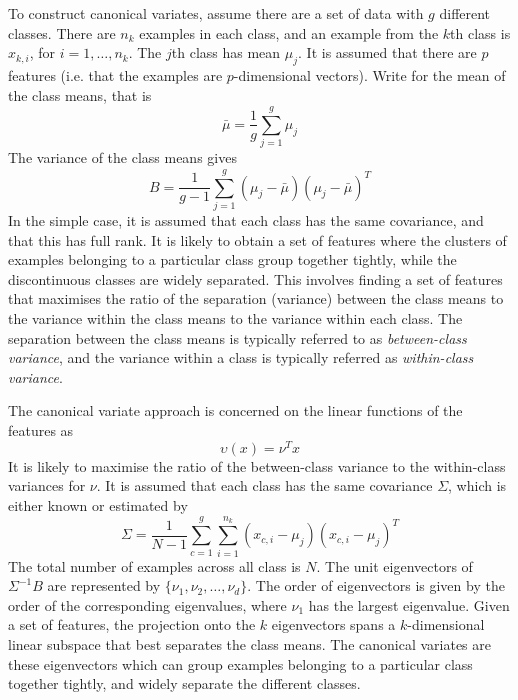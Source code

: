 To construct canonical variates, assume there are a set of data with $g$ different classes. There are $n_k$ examples in each class, and an example from the $k$th class is $x_{k,i}$, for $i = {1,\ldots,n_k}$. The $j$th class has mean $\mu_j$. It is assumed that there are $p$ features (i.e. that the examples are $p$-dimensional vectors). Write  for the mean of the class means, that is
\begin{equation}
 \bar{\mu} = \frac{1}{g}\sum_{j=1}^{g}\mu_j
\end{equation}
The variance of the class means gives
\begin{equation}
 B=\frac{1}{g-1}\sum_{j=1}^g (\mu_j-\bar{\mu}) (\mu_j-\bar{\mu})^T
\end{equation}
In the simple case, it is assumed that each class has the same covariance, and that this has full rank. It is likely to obtain a set of features where the clusters of examples belonging to a particular class group together tightly, while the discontinuous classes are widely separated. This involves finding a set of features that maximises the ratio of the separation (variance) between the class means to the variance within the class means to the variance within each class. The separation between the class means is typically referred to as \textit{between-class variance}, and the variance within a class is typically referred as \textit{within-class variance}.

The canonical variate approach is concerned on the linear functions of the features as
\begin{equation}
 \upsilon(x) = \nu^T x
\end{equation}
It is likely to maximise the ratio of the between-class variance to the within-class variances for $\nu$. It is assumed that each class has the same covariance $\Sigma$, which is either known or estimated by
\begin{equation}
 \Sigma = \frac{1}{N-1}\sum_{c=1}^g \sum_{i=1}^{n_k} (x_{c,i}-\mu_j) (x_{c,i}-\mu_j)^T
\end{equation}
The total number of examples across all class is $N$. The unit eigenvectors of $\Sigma^{-1}B$ are represented by $\{\nu_1, \nu_2,\ldots,\nu_d\}$. The order of eigenvectors is given by the order of the corresponding eigenvalues, where $\nu_1$ has the largest eigenvalue.  Given a set of features, the projection onto the $k$ eigenvectors spans a $k$-dimensional linear subspace that best separates the class means. The canonical variates are these eigenvectors which can group examples belonging to a particular class together tightly, and widely separate the different classes.

